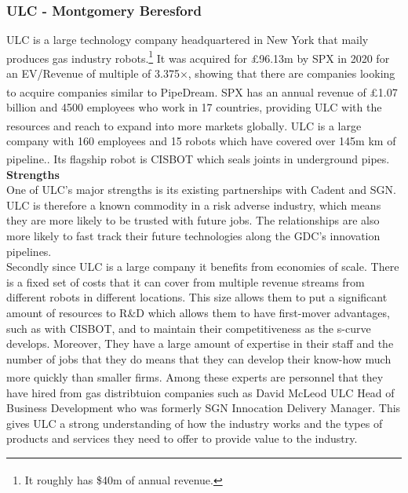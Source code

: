 \documentclass[11pt]{article}		%
\newcommand{\supercite}[1]{\textsuperscript{\cite{#1}}}		%
\begin{document}
     	\subsubsection[ULC]{ULC - Montgomery Beresford}
     	
     	ULC is a large technology company headquartered in New York that maily produces gas industry robots.\footnote{It roughly has \$40m of annual revenue.\supercite{SPX_acquisition}} It was acquired for £96.13m by SPX in 2020 for an EV/Revenue of multiple of 3.375$\times$, showing that there are companies looking to acquire companies similar to PipeDream\supercite{SPX_multiple}. SPX has an annual revenue of £1.07 billion and 4500 employees who work in 17 countries, providing ULC with the resources and reach to expand into more markets globally\supercite{SPX_acquisition}. ULC is a large company with 160 employees and  15 robots which have covered over 145m km of pipeline.\supercite{ULC_news}. Its flagship robot is CISBOT which seals joints in underground pipes.%
	        \\
	        \textbf{Strengths}
	        \\
	        One of ULC's major strengths is its existing partnerships with Cadent and SGN. ULC is therefore a known commodity in a risk adverse industry, which means they are more likely to be trusted with future jobs. The relationships are also more likely to fast track their future technologies along the GDC's innovation pipelines. 
	        \\ \hspace*{3ex}
	        Secondly since ULC is a large company it benefits from economies of scale. There is a fixed set of costs that it can cover from multiple revenue streams from different robots in different locations. This size allows them to put a significant amount of resources to R\&D which allows them to have first-mover advantages, such as with CISBOT, and to maintain their competitiveness as the s-curve develops. Moreover, They have a large amount of expertise in their staff and the number of jobs that they do means that they can develop their know-how much more quickly than smaller firms.\supercite{Barney} 
	        Among these experts are personnel that they have hired from gas distribtuion companies such as David McLeod ULC Head of Business Development who was formerly SGN Innocation Delivery Manager. This gives ULC a strong understanding of how the industry works and the types of products and services they need to offer to provide value to the industry.
\end{document}
